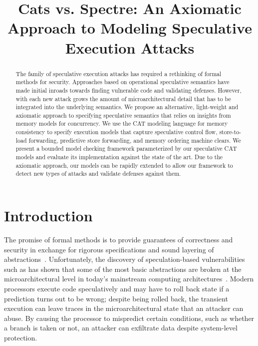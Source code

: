 \documentclass[conference]{IEEEtran}
\begin{document}
\title{Cats vs. Spectre: An Axiomatic Approach to Modeling Speculative Execution Attacks}

\author{
\and
{}
}

\maketitle
\thispagestyle{plain}
\pagestyle{plain}

\begin{abstract}
The \spectre{} family of speculative execution attacks has required a rethinking of formal methods for security. Approaches based on operational speculative semantics have made initial inroads towards finding vulnerable code and validating defenses. 
%
However, with each new attack grows the amount of microarchitectural detail that has to be integrated into the underlying semantics. 
%
We propose an alternative, light-weight and axiomatic approach to specifying speculative semantics that relies on insights from memory models for concurrency. We use the CAT modeling language for memory consistency to specify execution models that capture speculative control flow, store-to-load forwarding, predictive store forwarding, and memory ordering machine clears.
%
We present a bounded model checking framework parameterized by our speculative CAT models and evaluate its implementation against the state of the art. Due to the axiomatic approach, our models can be rapidly extended to allow our framework to detect new types of attacks and validate defenses against them.
%
\end{abstract}

\section{Introduction}
\label{sec:introduction}

The promise of formal methods is to provide guarantees of correctness and security in exchange for rigorous specifications and sound layering of abstractions~\cite{ChongGDMPSSZ16}. 
Unfortunately, the discovery of speculation-based vulnerabilities such as \spectre has shown that some of the most basic abstractions are broken at the microarchitectural level in today's mainstream computing architectures~\cite{KocherHFGGHHLM019}. 
%
Modern processors execute code speculatively and may have to roll back state if a prediction turns out to be wrong; despite being rolled back, the transient execution can leave traces in the microarchitectural state that an attacker can abuse. By causing the processor to mispredict certain conditions, such as whether a branch is taken or not, an attacker can exfiltrate data despite system-level protection. 
\end{document}
